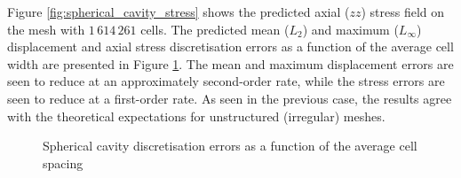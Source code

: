 \documentclass[sn-mathphys,Numbered]{sn-jnl}%
\begin{document}
Figure \ref{fig:spherical_cavity_stress} shows the predicted axial ($zz$) stress field on the mesh with $1\,614\,261$ cells.
The predicted mean ($L_2$) and maximum ($L_\infty$) displacement and axial stress discretisation errors as a function of the average cell width are presented in Figure \ref{fig:spherical_cavity_accuracy}.
The mean and maximum displacement errors are seen to reduce at an approximately second-order rate, while the stress errors are seen to reduce at a first-order rate.
As seen in the previous case, the results agree with the theoretical expectations for unstructured (irregular) meshes.
\begin{figure}[htbp]
	\centering
	\caption{Spherical cavity discretisation errors as a function of the average cell spacing}
	\label{fig:spherical_cavity_accuracy}
\end{figure}
\end{document}
